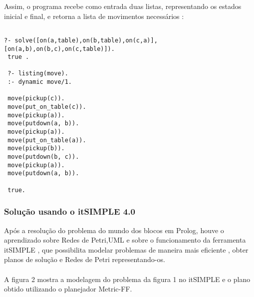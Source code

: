 \documentclass[12pt,titlepage]{article}
\begin{document}
\bigskip


 Assim, o programa recebe como entrada duas listas, representando os estados inicial e final, e retorna a lista de movimentos necessários :

 \singlespacing
 \begin{small}


 	\begin{verbatim}

?- solve([on(a,table),on(b,table),on(c,a)],[on(a,b),on(b,c),on(c,table)]).
 true .

 ?- listing(move).
 :- dynamic move/1.

 move(pickup(c)).
 move(put_on_table(c)).
 move(pickup(a)).
 move(putdown(a, b)).
 move(pickup(a)).
 move(put_on_table(a)).
 move(pickup(b)).
 move(putdown(b, c)).
 move(pickup(a)).
 move(putdown(a, b)).

 true.

 	\end{verbatim}


\doublespacing
\end{small}

\bigskip

\subsubsection{Solução usando o itSIMPLE 4.0}

  Após a resolução do problema do mundo dos blocos em Prolog, houve o aprendizado sobre Redes de Petri,UML \cite{uml} e sobre o funcionamento da ferramenta itSIMPLE \cite{itsimple2005} \cite{itsimple3.0} \cite{itsimple2.0} \cite{itsimple4.0}, que possibilita modelar problemas de maneira mais eficiente , obter planos de solução e Redes de Petri representando-os.
	\paragraph{}

	A figura 2 mostra a modelagem do problema da figura 1 no itSIMPLE e o plano obtido utilizando o planejador Metric-FF.
\end{document}
